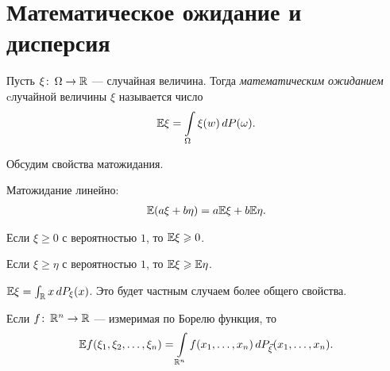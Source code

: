 
\newpage
\section{Математическое ожидание и дисперсия}
\begin{df}
 Пусть $ \xi \colon \, \Omega \to \mathbb{R}$ --- случайная величина. Тогда \textit{математическим ожиданием} cлучайной величины $ \xi $ называется число
 \begin{align*}
  \mathbb E \xi = \int\limits_{\Omega}  \xi(w)\,dP(\omega).
 \end{align*} 
\end{df}
Обсудим свойства матожидания.
\begin{prop}
 Матожидание линейно:
 \begin{align*}
  \mathbb E(a\xi + b\eta) = a \mathbb E \xi + b \mathbb E \eta.
 \end{align*} 
\end{prop}
\begin{prop}
 Если $ \xi \geqslant 0 $ с вероятностью $ 1 $, то $ \mathbb E \xi \geqslant 0 $.
\end{prop}
\begin{prop}
 Если $ \xi \geqslant \eta $ с вероятностью $ 1 $, то $ \mathbb E\xi \geqslant \mathbb E\eta $.
\end{prop}
\begin{prop}
 $ \mathbb E\xi = \int_{\mathbb{R}} x\,dP_\xi(x)  $.
 Это будет частным случаем более общего свойства.
\end{prop}
\begin{prop}
 Если $ f \colon\, \mathbb{R}^{n}\to\mathbb{R} $ --- измеримая по Борелю функция, то
 \begin{align*}
  \mathbb E f(\xi_1, \xi_2, \ldots, \xi_n) = \int\limits_{\mathbb{R}^{n}} f(x_1, \ldots, x_n) \,d P_{\vec\xi}(x_1, \ldots, x_n).
 \end{align*} 
\end{prop}
